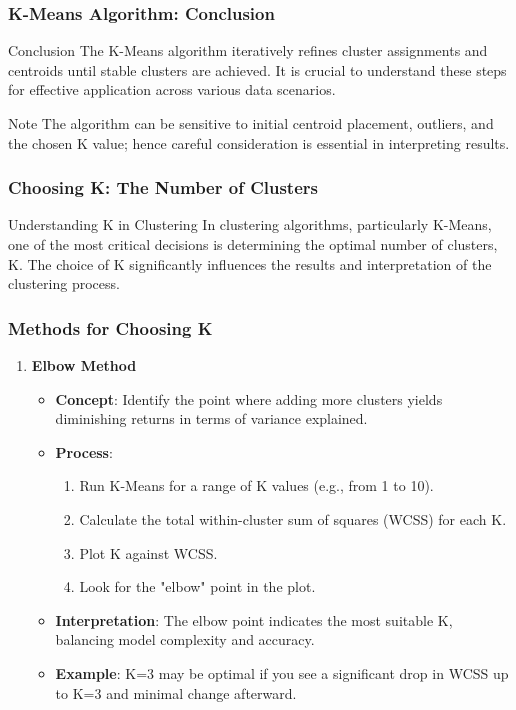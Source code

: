 \documentclass[aspectratio=169]{beamer}
\begin{document}
\begin{frame}[fragile]
    \frametitle{K-Means Algorithm: Conclusion}
    \begin{block}{Conclusion}
        The K-Means algorithm iteratively refines cluster assignments and centroids until stable clusters are achieved. It is crucial to understand these steps for effective application across various data scenarios.
    \end{block}
    
    \begin{block}{Note}
        The algorithm can be sensitive to initial centroid placement, outliers, and the chosen K value; hence careful consideration is essential in interpreting results.
    \end{block}
\end{frame}

\begin{frame}[fragile]
    \frametitle{Choosing K: The Number of Clusters}
    \begin{block}{Understanding K in Clustering}
        In clustering algorithms, particularly K-Means, one of the most critical decisions is determining the optimal number of clusters, K. The choice of K significantly influences the results and interpretation of the clustering process.
    \end{block}
\end{frame}

\begin{frame}[fragile]
    \frametitle{Methods for Choosing K}
    \begin{enumerate}
        \item \textbf{Elbow Method}
        \begin{itemize}
            \item \textbf{Concept}: Identify the point where adding more clusters yields diminishing returns in terms of variance explained.
            \item \textbf{Process}:
                \begin{enumerate}
                    \item Run K-Means for a range of K values (e.g., from 1 to 10).
                    \item Calculate the total within-cluster sum of squares (WCSS) for each K.
                    \item Plot K against WCSS.
                    \item Look for the "elbow" point in the plot.
                \end{enumerate}
            \item \textbf{Interpretation}: The elbow point indicates the most suitable K, balancing model complexity and accuracy.
            \item \textbf{Example}: K=3 may be optimal if you see a significant drop in WCSS up to K=3 and minimal change afterward.
        \end{itemize}
    \end{enumerate}
\end{frame}
\end{document}
